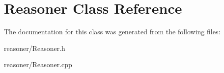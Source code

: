 \hypertarget{classReasoner}{}\section{Reasoner Class Reference}
\label{classReasoner}


The documentation for this class was generated from the following files\+:\begin{DoxyCompactItemize}
\item 
reasoner/Reasoner.\+h\item 
reasoner/Reasoner.\+cpp\end{DoxyCompactItemize}
